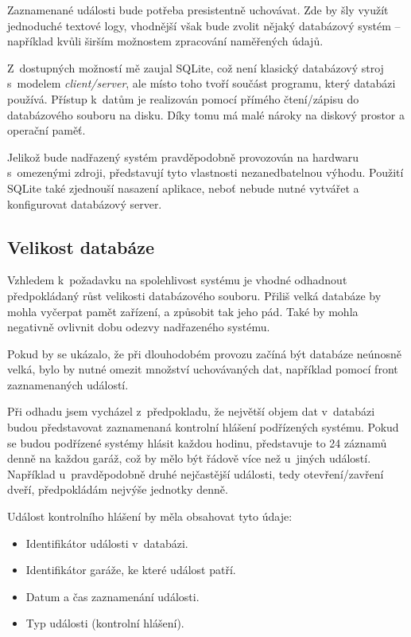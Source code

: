 Zaznamenané události bude potřeba presistentně uchovávat. Zde by šly využít jednoduché textové logy, vhodnější však bude zvolit nějaký databázový systém -- například kvůli širším možnostem zpracování naměřených údajů.

Z~dostupných možností mě zaujal SQLite, což není klasický databázový stroj s~modelem \textit{client/server}, ale místo toho tvoří součást programu, který databázi používá. Přístup k~datům je realizován pomocí přímého čtení/zápisu do databázového souboru na disku.  Díky tomu má malé nároky na diskový prostor a operační paměť. \cite{sqlite_about}

Jelikož bude nadřazený systém pravděpodobně provozován na hardwaru s~omezenými zdroji, představují tyto vlastnosti nezanedbatelnou výhodu. Použití SQLite také zjednouší nasazení aplikace, neboť nebude nutné vytvářet a konfigurovat databázový server.

\subsection{Velikost databáze}

Vzhledem k~požadavku na spolehlivost systému je vhodné odhadnout předpokládaný růst velikosti databázového souboru. Přiliš velká databáze by mohla vyčerpat pamět zařízení, a způsobit tak jeho pád. Také by mohla negativně ovlivnit dobu odezvy nadřazeného systému.

Pokud by se ukázalo, že při dlouhodobém provozu začíná být databáze neúnosně velká, bylo by nutné omezit množství uchovávaných dat, například pomocí front zaznamenaných událostí.

Při odhadu jsem vycházel z~předpokladu, že největší objem dat v~databázi budou představovat zaznamenaná kontrolní hlášení podřízených systému. Pokud se budou podřízené systémy hlásit každou hodinu, představuje to 24 záznamů denně na každou garáž, což by mělo být řádově více než u~jiných událostí. Například u~pravděpodobně druhé nejčastější události, tedy otevření/zavření dveří, předpokládám nejvýše jednotky denně.

Událost kontrolního hlášení by měla obsahovat tyto údaje:

\begin{itemize}
    \item Identifikátor události v~databázi.
    \item Identifikátor garáže, ke které událost patří.
    \item Datum a čas zaznamenání události.
    \item Typ události (kontrolní hlášení).
\end{itemize}

